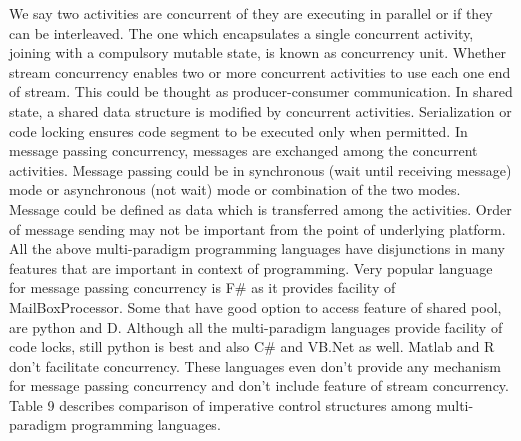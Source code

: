 \documentclass{sig-alternate}
\begin{document}
We say two activities are concurrent of they are executing in parallel or if they can be interleaved. The one which encapsulates a single concurrent activity, joining with a compulsory mutable state, is known as concurrency unit. Whether stream concurrency enables two or more concurrent activities to use each one end of stream. This could be thought as producer-consumer communication. In shared state, a shared data structure is modified by concurrent activities. Serialization or code locking ensures code segment to be executed only when permitted. In message passing concurrency, messages are exchanged among the concurrent activities. Message passing could be in synchronous (wait until receiving message) mode or asynchronous (not wait) mode or combination of the two modes. Message could be defined as data which is transferred among the activities. Order of message sending may not be important from the point of underlying platform.
\newline
All the above multi-paradigm programming languages have disjunctions in many features that are important in context of programming. Very popular language for message passing concurrency is F# as it provides facility of MailBoxProcessor. Some that have good option to access feature of shared pool, are python and D. Although all the multi-paradigm languages provide facility of code locks, still python is best and also C# and VB.Net as well. Matlab and R don’t facilitate concurrency. These languages even don’t provide any mechanism for message passing concurrency and don’t include feature of stream concurrency. Table 9 describes comparison of imperative control structures among multi-paradigm programming languages. 


\afterpage{\clearpage}
\end{document}
